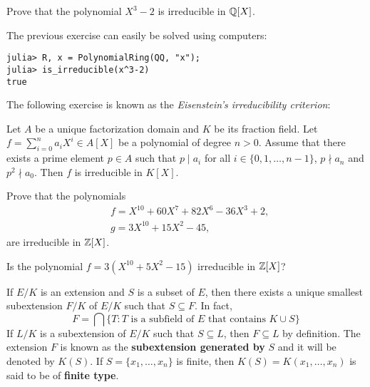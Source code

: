 \begin{exercise}
    Prove that the polynomial $X^3-2$ is irreducible in $\mathbb{Q}[X]$.  
\end{exercise}

The previous exercise can easily be solved using
computers: 
\begin{lstlisting}
julia> R, x = PolynomialRing(QQ, "x");
julia> is_irreducible(x^3-2)
true
\end{lstlisting}

The following exercise is known as the 
\emph{Eisenstein's irreducibility criterion}:

\begin{exercise}
    Let $A$ be a unique factorization domain and $K$ be its fraction field. 
    Let $f=\sum_{i=0}^n a_iX^i\in A[X]$ be a polynomial of degree $n>0$. 
    Assume that there exists a prime element $p\in A$ such that
    $p\mid a_i$ for all $i\in\{0,1,\dots,n-1\}$, $p\nmid a_n$ and
    $p^2\nmid a_0$. Then $f$ is irreducible in $K[X]$. 
\end{exercise}

\begin{exercise}
    Prove that
    the polynomials 
    \begin{align*}
    &f=X^{10}+60X^7+82X^6-36X^3+2,\\
    &g=3X^{10}+15X^2-45, 
    \end{align*}
    are irreducible in $\mathbb{Z}[X]$. 
\end{exercise}

\begin{exercise}
    Is the polynomial $f=3(X^{10}+5X^2-15)$ irreducible in $\mathbb{Z}[X]$? 
\end{exercise}


If $E/K$ is an extension and $S$ is a subset of $E$, then
there exists a unique smallest 
subextension $F/K$ of $E/K$ such that
$S\subseteq F$. In fact, 
\[
	F=\bigcap\{T:\text{$T$ is a subfield of $E$ that contains $K\cup S$}\} 
\]
If $L/K$ is a subextension of $E/K$ such that 
$S\subseteq L$, then $F\subseteq L$ by definition. The 
extension $F$ is known as the \textbf{subextension generated by} 
$S$ and
it will be denoted by $K(S)$. 
If $S=\{x_1,\dots,x_n\}$ is finite,
then $K(S)=K(x_1,\dots,x_n)$ is said to be of \textbf{finite type}. 

